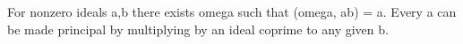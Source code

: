 For nonzero ideals a,b there exists omega such that (omega, ab) = a. Every a can be made principal by multiplying by an ideal coprime to any given b.
